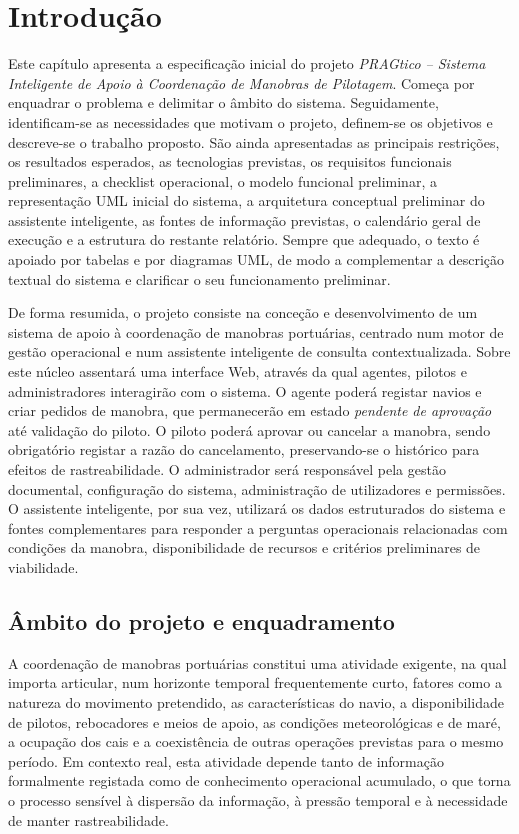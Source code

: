 \documentclass[a4paper,12pt]{report}
\begin{document}
\chapter{Introdução}
\label{chap:introducao}

Este capítulo apresenta a especificação inicial do projeto \textit{PRAGtico -- Sistema Inteligente de Apoio à Coordenação de Manobras de Pilotagem}. Começa por enquadrar o problema e delimitar o âmbito do sistema. Seguidamente, identificam-se as necessidades que motivam o projeto, definem-se os objetivos e descreve-se o trabalho proposto. São ainda apresentadas as principais restrições, os resultados esperados, as tecnologias previstas, os requisitos funcionais preliminares, a checklist operacional, o modelo funcional preliminar, a representação UML inicial do sistema, a arquitetura conceptual preliminar do assistente inteligente, as fontes de informação previstas, o calendário geral de execução e a estrutura do restante relatório. Sempre que adequado, o texto é apoiado por tabelas e por diagramas UML, de modo a complementar a descrição textual do sistema e clarificar o seu funcionamento preliminar.

De forma resumida, o projeto consiste na conceção e desenvolvimento de um sistema de apoio à coordenação de manobras portuárias, centrado num motor de gestão operacional e num assistente inteligente de consulta contextualizada. Sobre este núcleo assentará uma interface Web, através da qual agentes, pilotos e administradores interagirão com o sistema. O agente poderá registar navios e criar pedidos de manobra, que permanecerão em estado \textit{pendente de aprovação} até validação do piloto. O piloto poderá aprovar ou cancelar a manobra, sendo obrigatório registar a razão do cancelamento, preservando-se o histórico para efeitos de rastreabilidade. O administrador será responsável pela gestão documental, configuração do sistema, administração de utilizadores e permissões. O assistente inteligente, por sua vez, utilizará os dados estruturados do sistema e fontes complementares para responder a perguntas operacionais relacionadas com condições da manobra, disponibilidade de recursos e critérios preliminares de viabilidade.

\section{Âmbito do projeto e enquadramento}

A coordenação de manobras portuárias constitui uma atividade exigente, na qual importa articular, num horizonte temporal frequentemente curto, fatores como a natureza do movimento pretendido, as características do navio, a disponibilidade de pilotos, rebocadores e meios de apoio, as condições meteorológicas e de maré, a ocupação dos cais e a coexistência de outras operações previstas para o mesmo período. Em contexto real, esta atividade depende tanto de informação formalmente registada como de conhecimento operacional acumulado, o que torna o processo sensível à dispersão da informação, à pressão temporal e à necessidade de manter rastreabilidade.
\end{document}

